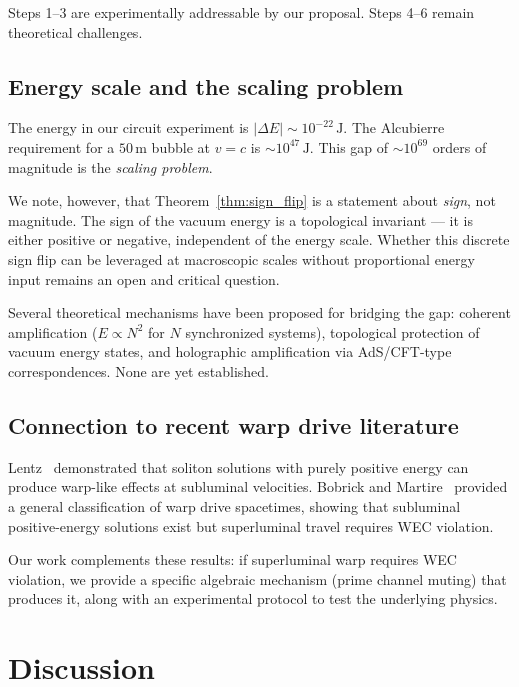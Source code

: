 \documentclass[aps,prd,twocolumn,superscriptaddress,nofootinbib]{revtex4-2}
\begin{document}
Steps 1--3 are experimentally addressable by our proposal.
Steps 4--6 remain theoretical challenges.

\subsection{Energy scale and the scaling problem}

The energy in our circuit experiment is $|{\Delta E}| \sim 10^{-22}\,\mathrm{J}$.
The Alcubierre requirement for a $50\,\mathrm{m}$ bubble at $v = c$
is $\sim 10^{47}\,\mathrm{J}$.
This gap of $\sim 10^{69}$ orders of magnitude is the
\emph{scaling problem}.

We note, however, that Theorem~\ref{thm:sign_flip} is a statement
about \emph{sign}, not magnitude.
The sign of the vacuum energy is a topological invariant ---
it is either positive or negative, independent of the energy scale.
Whether this discrete sign flip can be leveraged at macroscopic
scales without proportional energy input remains an open
and critical question.

Several theoretical mechanisms have been proposed for bridging
the gap: coherent amplification ($E \propto N^2$ for $N$
synchronized systems), topological protection of vacuum energy
states, and holographic amplification via AdS/CFT-type
correspondences. None are yet established.

\subsection{Connection to recent warp drive literature}

Lentz~\cite{Lentz2021} demonstrated that soliton solutions with
purely positive energy can produce warp-like effects at subluminal
velocities. Bobrick and Martire~\cite{BobrickMartire2021}
provided a general classification of warp drive spacetimes,
showing that subluminal positive-energy solutions exist but
superluminal travel requires WEC violation.

Our work complements these results: if superluminal warp requires
WEC violation, we provide a specific algebraic mechanism
(prime channel muting) that produces it, along with an
experimental protocol to test the underlying physics.

\section{Discussion}
\label{sec:discussion}
\end{document}
